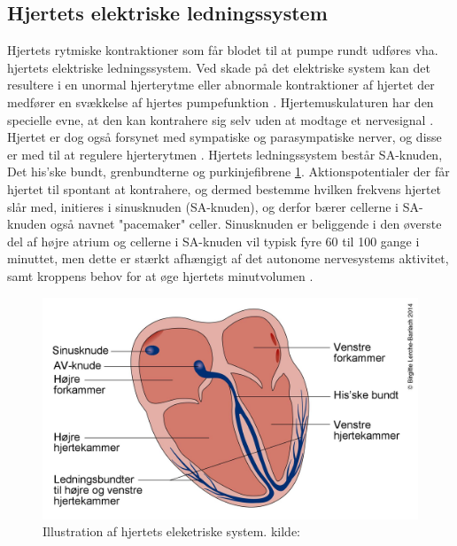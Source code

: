 \subsection{Hjertets elektriske ledningssystem}\label{Hjertets_elektriske_ledningssystem}
Hjertets rytmiske kontraktioner som får blodet til at pumpe rundt udføres vha. hjertets elektriske ledningssystem. Ved skade på det elektriske system kan det resultere i en unormal hjerterytme eller abnormale kontraktioner af hjertet der medfører en svækkelse af hjertes pumpefunktion \cite{guyton}. Hjertemuskulaturen har den specielle evne, at den kan kontrahere sig selv uden at modtage et nervesignal \cite{gronanatomi}. Hjertet er dog også forsynet med sympatiske og parasympatiske nerver, og disse er med til at regulere hjerterytmen \cite{cindy}. 
Hjertets ledningssystem består SA-knuden, Det his'ske bundt, grenbundterne og purkinjefibrene \ref{fig:hjerte_elektriske}.
Aktionspotentialer der får hjertet til spontant at kontrahere, og dermed bestemme hvilken frekvens hjertet slår med, initieres i sinusknuden (SA-knuden), og derfor bærer cellerne i SA-knuden også navnet "pacemaker" celler.
Sinusknuden er beliggende i den øverste del af højre atrium og cellerne i SA-knuden vil typisk fyre 60 til 100 gange i minuttet, men dette er stærkt afhængigt af det autonome nervesystems aktivitet, samt kroppens behov for at øge hjertets
minutvolumen \cite{ekgbook}.

\begin{figure}[H] %
\begin{center}
\includegraphics[width=1\textwidth]{figures/hjerte_elektrisk}
\end{center}
\caption{Illustration af hjertets eleketriske system. kilde: \cite{elektriske}}
\label{fig:hjerte_elektriske}
\end{figure}

